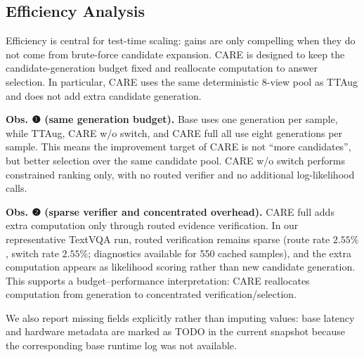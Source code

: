 \subsection{Efficiency Analysis}
Efficiency is central for test-time scaling: gains are only compelling when they do not come from brute-force candidate expansion. CARE is designed to keep the candidate-generation budget fixed and reallocate computation to answer selection. In particular, CARE uses the same deterministic 8-view pool as TTAug and does not add extra candidate generation.



\textbf{Obs. ❶ (same generation budget).}
Base uses one generation per sample, while TTAug, CARE w/o switch, and CARE full all use eight generations per sample.
This means the improvement target of CARE is not ``more candidates'', but better selection over the same candidate pool.
CARE w/o switch performs constrained ranking only, with no routed verifier and no additional log-likelihood calls.

\textbf{Obs. ❷ (sparse verifier and concentrated overhead).}
CARE full adds extra computation only through routed evidence verification.
In our representative TextVQA run, routed verification remains sparse (route rate $2.55\%$, switch rate $2.55\%$; diagnostics available for 550 cached samples), and the extra computation appears as likelihood scoring rather than new candidate generation.
This supports a budget--performance interpretation: CARE reallocates computation from generation to concentrated verification/selection.

We also report missing fields explicitly rather than imputing values: base latency and hardware metadata are marked as TODO in the current snapshot because the corresponding base runtime log was not available.
